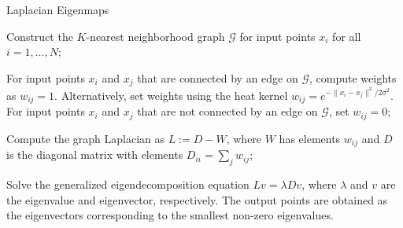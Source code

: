 \documentclass[11pt,a4paper,]{article}
\begin{document}
\begin{algorithm}[!htb]
  \caption{Laplacian Eigenmaps}
  \label{alg:le}
  \DontPrintSemicolon
  \SetAlgoLined
  \BlankLine

  Construct the $K$-nearest neighborhood graph $\mathcal{G}$ for input points $x_i$ for all $i=1,\ldots,N$;

  For input points $x_i$ and $x_j$ that are connected by an edge on $\mathcal{G}$, compute weights as $w_{ij}=1$. Alternatively, set weights using the heat kernel $w_{i j}=e^{-\|x_{i}-x_{j}\|^{2} / 2 \sigma^{2}}$. For input points $x_i$ and $x_j$ that are not connected by an edge on $\mathcal{G}$, set $w_{ij}=0$;

  Compute the graph Laplacian as $L := D-W$, where $W$ has elements $w_{ij}$ and $D$ is the diagonal matrix with elements $D_{i i}=\sum_{j} w_{i j}$;

  Solve the generalized eigendecomposition equation $Lv = \lambda Dv$, where $\lambda$ and $v$ are the eigenvalue and eigenvector, respectively. The output points are obtained as the eigenvectors corresponding to the smallest non-zero eigenvalues.

\end{algorithm}
\end{document}

